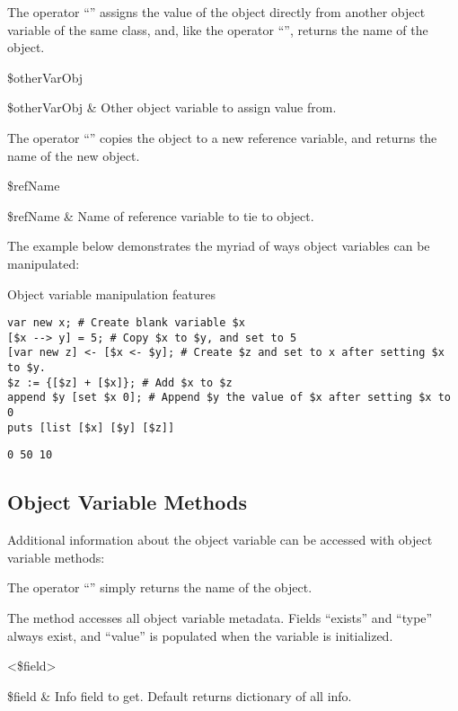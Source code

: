 \documentclass{article}
\begin{document}
The operator ``\texttt{}'' assigns the value of the object directly from another object variable of the same class, and, like the operator  ``\texttt{}'', returns the name of the object.
\begin{syntax}
 \$otherVarObj 
\end{syntax}
\begin{args}
\$otherVarObj & Other object variable to assign value from.
\end{args}
The operator ``\texttt{}'' copies the object to a new reference variable, and returns the name of the new object.
\begin{syntax}
 \$refName
\end{syntax}
\begin{args}
\$refName & Name of reference variable to tie to object. 
\end{args}

The example below demonstrates the myriad of ways object variables can be manipulated:

\begin{example}{Object variable manipulation features}
\begin{lstlisting}
var new x; # Create blank variable $x
[$x --> y] = 5; # Copy $x to $y, and set to 5
[var new z] <- [$x <- $y]; # Create $z and set to x after setting $x to $y.
$z := {[$z] + [$x]}; # Add $x to $z
append $y [set $x 0]; # Append $y the value of $x after setting $x to 0
puts [list [$x] [$y] [$z]]
\end{lstlisting}
\tcblower
\begin{lstlisting}
0 50 10
\end{lstlisting}
\end{example}

\clearpage
\subsection{Object Variable Methods}
Additional information about the object variable can be accessed with object variable methods:

The operator ``\textbf{\texttt{}}'' simply returns the name of the object.
\begin{syntax}
\end{syntax}

The method  accesses all object variable metadata. 
Fields ``exists'' and ``type'' always exist, and ``value'' is populated when the variable is initialized.
\begin{syntax}
 <\$field>
\end{syntax}
\begin{args}
\$field & Info field to get. Default returns dictionary of all info. \\
\end{args}
\end{document}
